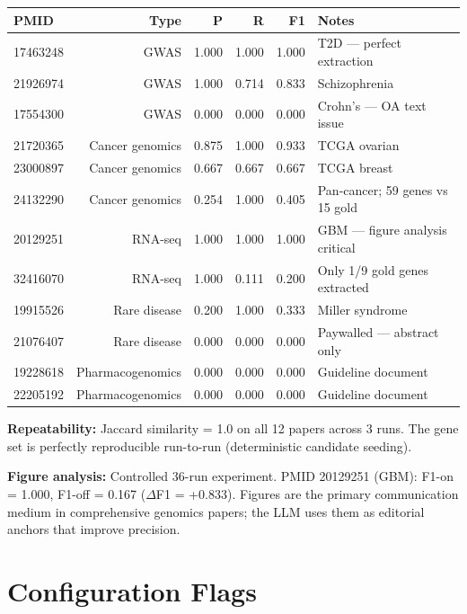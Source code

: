 \documentclass[11pt,a4paper]{article}
\begin{document}
\begin{center}
\begin{tabular}{lrrrrl}
\toprule
\textbf{PMID} & \textbf{Type} & \textbf{P} & \textbf{R} & \textbf{F1} & \textbf{Notes} \\
\midrule
17463248 & GWAS              & 1.000 & 1.000 & 1.000 & T2D --- perfect extraction \\
21926974 & GWAS              & 1.000 & 0.714 & 0.833 & Schizophrenia \\
17554300 & GWAS              & 0.000 & 0.000 & 0.000 & Crohn's --- OA text issue \\
21720365 & Cancer genomics   & 0.875 & 1.000 & 0.933 & TCGA ovarian \\
23000897 & Cancer genomics   & 0.667 & 0.667 & 0.667 & TCGA breast \\
24132290 & Cancer genomics   & 0.254 & 1.000 & 0.405 & Pan-cancer; 59 genes vs 15 gold \\
20129251 & RNA-seq           & 1.000 & 1.000 & 1.000 & GBM --- figure analysis critical \\
32416070 & RNA-seq           & 1.000 & 0.111 & 0.200 & Only 1/9 gold genes extracted \\
19915526 & Rare disease      & 0.200 & 1.000 & 0.333 & Miller syndrome \\
21076407 & Rare disease      & 0.000 & 0.000 & 0.000 & Paywalled --- abstract only \\
19228618 & Pharmacogenomics  & 0.000 & 0.000 & 0.000 & Guideline document \\
22205192 & Pharmacogenomics  & 0.000 & 0.000 & 0.000 & Guideline document \\
\bottomrule
\end{tabular}
\end{center}

\textbf{Repeatability:} Jaccard similarity = 1.0 on all 12 papers across 3 runs. The gene set is perfectly reproducible run-to-run (deterministic candidate seeding).

\textbf{Figure analysis:} Controlled 36-run experiment. PMID 20129251 (GBM): F1-on = 1.000, F1-off = 0.167 ($\Delta$F1 = +0.833). Figures are the primary communication medium in comprehensive genomics papers; the LLM uses them as editorial anchors that improve precision.

\section{Configuration Flags}
\end{document}
